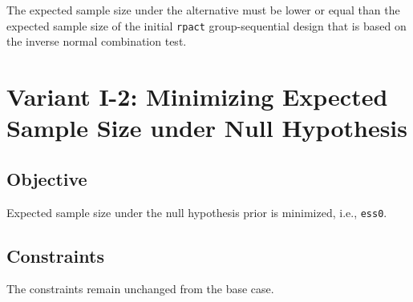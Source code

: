 \documentclass[
]{book}
\newenvironment{Shaded}{\begin{snugshade}}{\end{snugshade}}
\newcommand{\DecValTok}[1]{\textcolor[rgb]{0.00,0.00,0.81}{#1}}
\newcommand{\KeywordTok}[1]{\textcolor[rgb]{0.13,0.29,0.53}{\textbf{#1}}}
\newcommand{\NormalTok}[1]{#1}
\newcommand{\OperatorTok}[1]{\textcolor[rgb]{0.81,0.36,0.00}{\textbf{#1}}}
\newcommand{\StringTok}[1]{\textcolor[rgb]{0.31,0.60,0.02}{#1}}
\begin{document}
The expected sample size under the alternative must be lower or equal than
the expected sample size of the initial \texttt{rpact} group-sequential design that
is based on the inverse normal combination test.

\begin{Shaded}
\end{Shaded}

\hypertarget{variantI_2}{%
\section{Variant I-2: Minimizing Expected Sample Size under Null Hypothesis}\label{variantI_2}}

\hypertarget{objective-1}{%
\subsection{Objective}\label{objective-1}}

Expected sample size under the null hypothesis prior is minimized,
i.e., \texttt{ess0}.

\hypertarget{constraints-1}{%
\subsection{Constraints}\label{constraints-1}}

The constraints remain unchanged from the base case.
\end{document}
